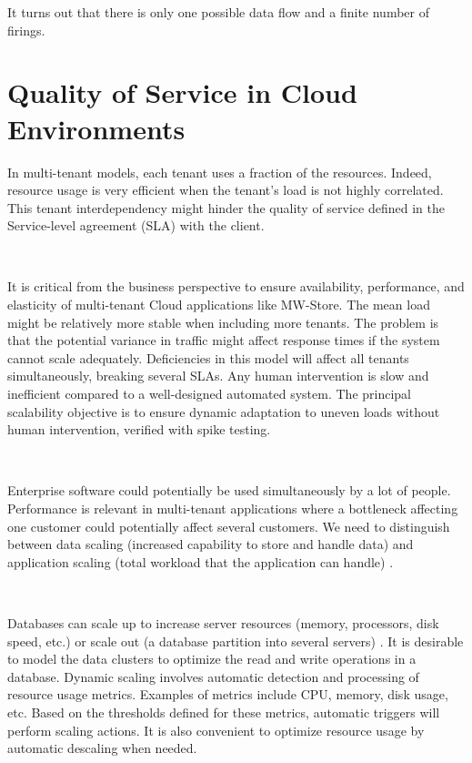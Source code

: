 \documentclass[12pt,english]{article} %
\begin{document}
It turns out that there is only one possible data flow and a finite number of firings.



\newpage


\section{Quality of Service in Cloud Environments}
In multi-tenant models, each tenant uses a fraction of the resources.
Indeed, resource usage is very efficient when the tenant's load is not highly correlated.
This tenant interdependency might hinder the quality of service defined in the Service-level agreement (SLA) with the client.

\

It is critical from the business perspective to ensure availability, performance, and elasticity of multi-tenant Cloud applications like MW-Store.
The mean load might be relatively more stable when including more tenants.
The problem is that the potential variance in traffic might affect response times if the system cannot scale adequately.
Deficiencies in this model will affect all tenants simultaneously, breaking several SLAs.
Any human intervention is slow and inefficient compared to a well-designed automated system.
The principal scalability objective is to ensure dynamic adaptation to uneven loads without human intervention, verified with spike testing.

\

Enterprise software could potentially be used simultaneously by a lot of people.
Performance is relevant in multi-tenant applications where a bottleneck affecting one customer could potentially affect several customers.
We need to distinguish between data scaling (increased capability to store and handle data) and application scaling (total workload that the application can handle) \cite{multi-tenant-data-architecture}.

\

Databases can scale up to increase server resources (memory, processors, disk speed, etc.) or scale out (a database partition into several servers) \cite{multi-tenant-data-architecture}.
It is desirable to model the data clusters to optimize the read and write operations in a database.
Dynamic scaling involves automatic detection and processing of resource usage metrics.
Examples of metrics include CPU, memory, disk usage, etc.
Based on the thresholds defined for these metrics, automatic triggers will perform scaling actions.
It is also convenient to optimize resource usage by automatic descaling when needed.
\end{document}
